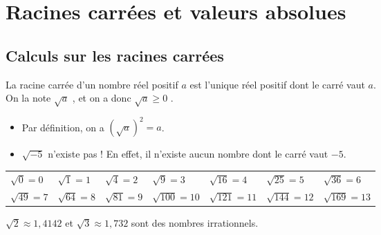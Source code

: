 


\chapter{Racines carrées et valeurs absolues}




\section{Calculs sur les racines carrées}

\begin{Définition}
La racine carrée d'un nombre réel positif $a$ est l'unique réel positif dont le carré vaut $a$. \\ On la note $\sqrt{a}$ , et on a donc $\sqrt{a}\geq 0$ .
\end{Définition}

\begin{Remarque}
\leavevmode\vspace{-\baselineskip}
\begin{itemize}[label=\textcolor{Couleur7}{$\bullet$}]
\item Par définition, on a $\left(\sqrt{a}\right)^2=a$.
\item $\sqrt{-5}$ n'existe pas ! En effet, il n'existe aucun nombre dont le carré vaut $-5$.
\end{itemize}

\end{Remarque}


\begin{Exemple}
\renewcommand{\arraystretch}{1.3}
\begin{tabular}{>{\centering\arraybackslash}m{2cm}>{\centering\arraybackslash}m{2cm}>{\centering\arraybackslash}m{2cm}>{\centering\arraybackslash}m{2cm}>{\centering\arraybackslash}m{2cm}>{\centering\arraybackslash}m{2cm}>{\centering\arraybackslash}m{2cm}}
 $\sqrt{0}=0$ & $\sqrt{1}=1$ & $\sqrt{4}=2$ & $\sqrt{9}=3$ & $\sqrt{16}=4$ & $\sqrt{25}=5$ & $\sqrt{36}=6$  \\
$\sqrt{49}=7$ & $\sqrt{64}=8$ & $\sqrt{81}=9$ & $\sqrt{100}=10$ & $\sqrt{121}=11$ & $\sqrt{144}=12$ & $\sqrt{169}=13$
\end{tabular}

\end{Exemple}

\begin{Remarque}
$\sqrt{2}\approx 1,4142$ et $\sqrt{3}\approx 1,732$ sont des nombres irrationnels.

\end{Remarque}

